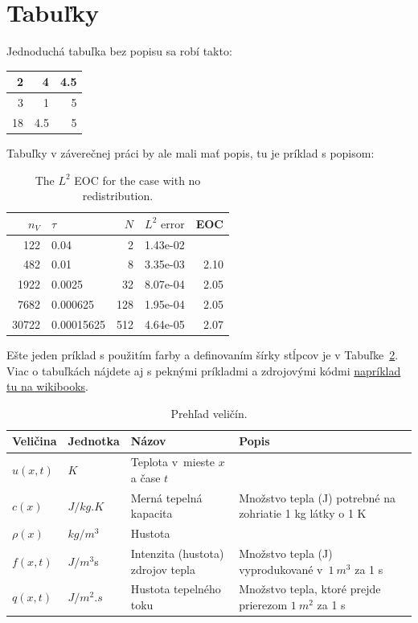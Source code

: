 \section{Tabuľky}

Jednoduchá tabuľka bez popisu sa robí takto:

\begin{tabular}{|r|r|r|}
	\hline
	2 &   4 & 4.5 \\ \hline
	3 &   1 &   5 \\
	18 & 4.5 &   5 \\ \hline
\end{tabular}

Tabuľky v záverečnej práci by ale mali mať popis, tu je príklad s popisom: 
\begin{table}[!h]
	\centering
	\caption{The $L^2$ EOC for the case with no redistribution.}
	\begin{tabular}{rlrrr}
		\hline
		$n_V$ & $\tau$     & $N$ & $ L^2\mbox{ error}$ &  EOC \\ \hline
		122 & 0.04       &   2 &            1.43e-02 &      \\
		482 & 0.01       &   8 &            3.35e-03 & 2.10 \\
		1922 & 0.0025     &  32 &            8.07e-04 & 2.05 \\
		7682 & 0.000625   & 128 &            1.95e-04 & 2.05 \\
		30722 & 0.00015625 & 512 &            4.64e-05 & 2.07 \\ \hline
	\end{tabular}
	\label{tab:resultsDDFV}
\end{table}

Ešte jeden príklad s použitím farby a definovaním šírky stĺpcov je v Tabuľke~\ref{tab:Veliciny}. Viac o tabuľkách nájdete aj s peknými príkladmi a zdrojovými kódmi \href{https://en.wikibooks.org/wiki/LaTeX/Tables#Basic_examples}{napríklad tu na wikibooks}.
\begin{table}[h]
	\centering
	\caption{Prehľad veličín.} \label{tab:Veliciny}
	\begin{tabular}{|l|l|p{45mm}|p{60mm}|}
		\hline
		\rowcolor[gray]{.8}
		Veličina & Jednotka & Názov & Popis  \\ \hline
		$u(x,t)$ & $\si{K}$ & Teplota v~mieste $x$ a čase $t$ &   \\ \hline
		$c(x)$ & $\si{J/kg.K}$ & Merná tepelná kapacita & Množstvo tepla (J) potrebné na zohriatie 1 kg látky o 1 K  \\ \hline
		$\rho(x)$ & $\si{kg/m^3}$ & Hustota &  \\ \hline
		$f(x,t)$ & $\si{J/m^3}$s & Intenzita (hustota) \newline zdrojov tepla & Množstvo tepla (J) vyprodukované v~$\SI{1}{m^3}$ za 1 s   \\ \hline
		$q(x,t)$ & $\si{J/m^2.s}$ & Hustota tepelného toku & Množstvo tepla, ktoré prejde prierezom $\SI{1}{m^2}$ za 1 s  \\ \hline
	\end{tabular}
\end{table}

